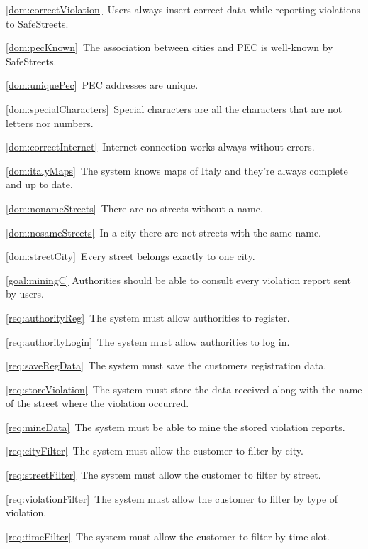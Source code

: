 \begin{description}
\begin{description}
\begin{description}
							\item \ref{dom:correctViolation}\ Users always insert correct data while reporting violations to SafeStreets.
							\item \ref{dom:pecKnown}\ The association between cities and PEC is well-known by SafeStreets.
							\item \ref{dom:uniquePec}\ PEC addresses are unique.
							\item \ref{dom:specialCharacters}\ Special characters are all the characters that are not letters nor numbers.
							\item \ref{dom:correctInternet}\ Internet connection works always without errors.
							\item \ref{dom:italyMaps}\ The system knows maps of Italy and they’re always complete and up to date.
							\item \ref{dom:nonameStreets}\ There are no streets without a name.
							\item \ref{dom:nosameStreets}\ In a city there are not streets with the same name.
							\item \ref{dom:streetCity}\ Every street belongs exactly to one city.
						\end{description}
					\item \ref{goal:miningC} Authorities should be able to consult every violation report sent by users.
						\begin{description}
							\item \ref{req:authorityReg}\ The system must allow authorities to register.
							\item \ref{req:authorityLogin}\ The system must allow authorities to log in.
							\item \ref{req:saveRegData}\ The system must save the customers registration data.
							\item \ref{req:storeViolation}\ The system must store the data received along with the name of the street where the violation occurred.
							\item \ref{req:mineData}\ The system must be able to mine the stored violation reports.
							\item \ref{req:cityFilter}\ The system must allow the customer to filter by city.
							\item \ref{req:streetFilter}\ The system must allow the customer to filter by street.
							\item \ref{req:violationFilter}\ The system must allow the customer to filter by type of violation.
							\item \ref{req:timeFilter}\ The system must allow the customer to filter by time slot.

\end{description}
\end{description}
\end{description}
